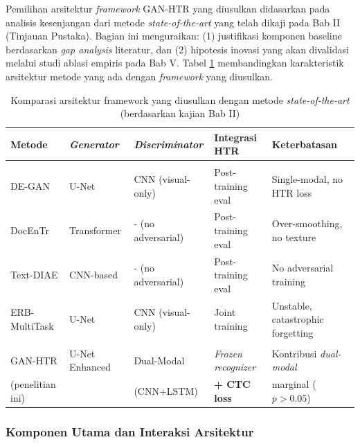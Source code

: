 \documentclass[12pt,a4paper]{book}
\begin{document}
Pemilihan arsitektur \textit{framework} GAN-HTR yang diusulkan didasarkan pada analisis kesenjangan dari metode \textit{state-of-the-art} yang telah dikaji pada Bab II (Tinjauan Pustaka). Bagian ini menguraikan: (1) justifikasi komponen baseline berdasarkan \textit{gap analysis} literatur, dan (2) hipotesis inovasi yang akan divalidasi melalui studi ablasi empiris pada Bab V. Tabel \ref{tab:arsitektur-komparasi} membandingkan karakteristik arsitektur metode yang ada dengan \textit{framework} yang diusulkan.

\begin{table}[H]
\centering
\caption{Komparasi arsitektur framework yang diusulkan dengan metode \textit{state-of-the-art} (berdasarkan kajian Bab II)}
\label{tab:arsitektur-komparasi}
\footnotesize
\begin{tabularx}{\textwidth}{|>{\raggedright\arraybackslash}X|>{\raggedright\arraybackslash}X|>{\raggedright\arraybackslash}X|>{\raggedright\arraybackslash}X|>{\raggedright\arraybackslash}X|}
\hline
\textbf{Metode} & \textit{Generator} & \textit{Discriminator} & Integrasi HTR & Keterbatasan \\
\hline
\multicolumn{5}{|l|}{Metode \textit{Existing} (Bab II)} \\
\hline
DE-GAN & U-Net & CNN (visual-only) & Post-training eval & Single-modal, no HTR loss \\
\hline
DocEnTr & Transformer & - (no adversarial) & Post-training eval & Over-smoothing, no texture \\
\hline
Text-DIAE & CNN-based & - (no adversarial) & Post-training eval & No adversarial training \\
\hline
ERB-MultiTask & U-Net & CNN (visual-only) & Joint training & Unstable, catastrophic forgetting \\
\hline
\multicolumn{5}{|l|}{\textit{Framework} yang Diusulkan} \\
\hline
GAN-HTR & U-Net Enhanced & Dual-Modal & \textit{Frozen recognizer} & Kontribusi \textit{dual-modal} \\
(penelitian ini) &  & (CNN+LSTM) & \textbf{+ CTC loss} & marginal ($p>0.05$) \\
\hline
\end{tabularx}
\end{table}


\subsubsection{Komponen Utama dan Interaksi Arsitektur} %
\label{subsubsec:komponen-arsitektur}
\end{document}
